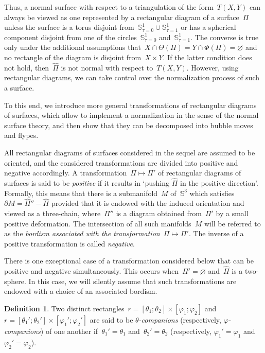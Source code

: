 \documentclass{amsart}
\theoremstyle{theorem}
\theoremstyle{remark}
\theoremstyle{definition}
\newtheorem{defi}[theo]{Definition}
\numberwithin{equation}{section}
\numberwithin{figure}{section}
\begin{document}
Thus, a normal surface with respect to a triangulation of the form~$T(X,Y)$ can always be viewed as one represented
by a rectangular diagram of a surface~$\Pi$ unless the surface is a torus disjoint from~$\mathbb S^1_{\tau=0}\cup\mathbb S^1_{\tau=1}$
or has a spherical component disjoint from one of the circles~$\mathbb S^1_{\tau=0}$
and~$\mathbb S^1_{\tau=1}$. The converse is true only under the additional assumptions that~$X\cap\Theta(\Pi)=Y\cap\Phi(\Pi)=\varnothing$
and no rectangle of the diagram is disjoint from~$X\times Y$. If the latter condition does not hold, then~$\widehat\Pi$
is not normal with respect to~$T(X,Y)$. However, using rectangular diagrams, we can take control over the normalization
process of such a surface.

To this end, we introduce more general transformations of rectangular diagrams of surfaces,
which allow to implement a normalization in the sense of the normal surface theory,
and then show that they can be decomposed into bubble moves and flypes.

All rectangular diagrams of surfaces considered in the sequel are assumed to
be oriented, and the considered transformations are divided into positive and negative
accordingly.
A transformation~$\Pi\mapsto\Pi'$ of rectangular diagrams of surfaces
is said to be \emph{positive} if it results in `pushing $\widehat\Pi$ in the positive direction'.
Formally, this means that there is a submanifold~$M$ of~$\mathbb S^3$ which satisfies~$\partial M=\widehat\Pi''-\widehat\Pi$ provided
that it is endowed with the induced orientation and viewed as a three-chain, where~$\Pi''$ is a diagram obtained from~$\Pi'$ by a small positive deformation.
The intersection of all such manifolds~$M$ will be referred to
as the \emph{bordism associated with the transformation~$\Pi\mapsto\Pi'$}. The
inverse of a positive transformation is called \emph{negative}.

There is one exceptional case of a transformation considered below that can be positive and negative simultaneously.
This occurs when~$\Pi'=\varnothing$ and~$\widehat\Pi$ is a two-sphere. In this case,
we will silently assume that such transformations are endowed with a choice of an associated bordism.

\begin{defi}
Two distinct rectangles~$r=[\theta_1;\theta_2]\times[\varphi_1;\varphi_2]$
and~$r=[\theta_1';\theta_2']\times[\varphi_1';\varphi_2']$ are said to be
\emph{$\theta$-companions} (respectively, \emph{$\varphi$-companions})
of one another if~$\theta_1'=\theta_1$ and~$\theta_2'=\theta_2$ (respectively,
$\varphi_1'=\varphi_1$ and~$\varphi_2'=\varphi_2$).
\end{defi}
\end{document}
